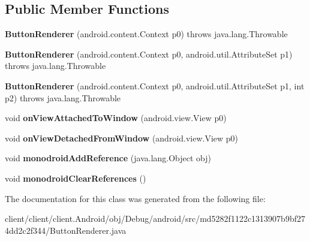 \subsection*{Public Member Functions}
\begin{DoxyCompactItemize}
\item 
\hypertarget{classmd5282f1122c1313907b9bf274dd2c2f344_1_1ButtonRenderer_ac366ed7682795dcedfeda8d9e0123600}{}{\bfseries Button\+Renderer} (android.\+content.\+Context p0)  throws java.\+lang.\+Throwable 	\label{classmd5282f1122c1313907b9bf274dd2c2f344_1_1ButtonRenderer_ac366ed7682795dcedfeda8d9e0123600}

\item 
\hypertarget{classmd5282f1122c1313907b9bf274dd2c2f344_1_1ButtonRenderer_a4ec0ab2212c95a6e9de6272b45ee9100}{}{\bfseries Button\+Renderer} (android.\+content.\+Context p0, android.\+util.\+Attribute\+Set p1)  throws java.\+lang.\+Throwable 	\label{classmd5282f1122c1313907b9bf274dd2c2f344_1_1ButtonRenderer_a4ec0ab2212c95a6e9de6272b45ee9100}

\item 
\hypertarget{classmd5282f1122c1313907b9bf274dd2c2f344_1_1ButtonRenderer_aca89cbadb6f061eefa8b75cf00798d47}{}{\bfseries Button\+Renderer} (android.\+content.\+Context p0, android.\+util.\+Attribute\+Set p1, int p2)  throws java.\+lang.\+Throwable 	\label{classmd5282f1122c1313907b9bf274dd2c2f344_1_1ButtonRenderer_aca89cbadb6f061eefa8b75cf00798d47}

\item 
\hypertarget{classmd5282f1122c1313907b9bf274dd2c2f344_1_1ButtonRenderer_a85fb9e732121e3066d2980b8fdd72d03}{}void {\bfseries on\+View\+Attached\+To\+Window} (android.\+view.\+View p0)\label{classmd5282f1122c1313907b9bf274dd2c2f344_1_1ButtonRenderer_a85fb9e732121e3066d2980b8fdd72d03}

\item 
\hypertarget{classmd5282f1122c1313907b9bf274dd2c2f344_1_1ButtonRenderer_aa26b540fb7a7e5b21cc3ba58b9acf16e}{}void {\bfseries on\+View\+Detached\+From\+Window} (android.\+view.\+View p0)\label{classmd5282f1122c1313907b9bf274dd2c2f344_1_1ButtonRenderer_aa26b540fb7a7e5b21cc3ba58b9acf16e}

\item 
\hypertarget{classmd5282f1122c1313907b9bf274dd2c2f344_1_1ButtonRenderer_aca434da57ef365821cbf94ea8c1d6272}{}void {\bfseries monodroid\+Add\+Reference} (java.\+lang.\+Object obj)\label{classmd5282f1122c1313907b9bf274dd2c2f344_1_1ButtonRenderer_aca434da57ef365821cbf94ea8c1d6272}

\item 
\hypertarget{classmd5282f1122c1313907b9bf274dd2c2f344_1_1ButtonRenderer_a4fd5279a1f246a17625fc5e56c8dfc82}{}void {\bfseries monodroid\+Clear\+References} ()\label{classmd5282f1122c1313907b9bf274dd2c2f344_1_1ButtonRenderer_a4fd5279a1f246a17625fc5e56c8dfc82}

\end{DoxyCompactItemize}


The documentation for this class was generated from the following file\+:\begin{DoxyCompactItemize}
\item 
client/client/client.\+Android/obj/\+Debug/android/src/md5282f1122c1313907b9bf274dd2c2f344/Button\+Renderer.\+java\end{DoxyCompactItemize}
